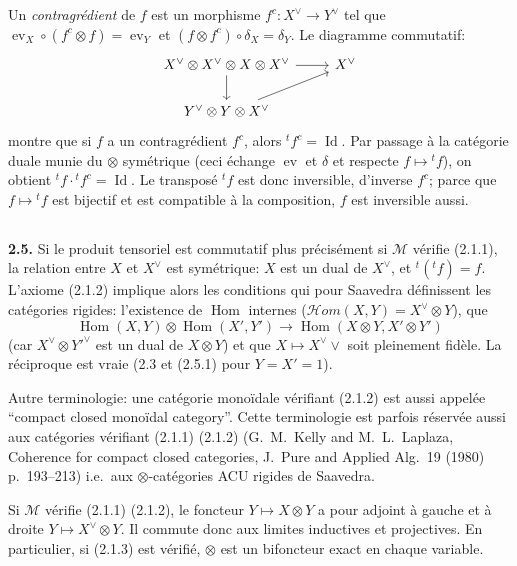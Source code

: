 \documentclass[12pt,a4paper]{article}
\theoremstyle{plain}
\theoremstyle{definition}
\theoremstyle{remark}
\DeclareMathOperator{\Hom}{Hom}
\DeclareMathOperator{\Id}{Id}
\DeclareMathOperator{\ev}{ev}
\begin{document}
Un \emph{contragrédient} de $f$ est un morphisme $f^c : X^\vee \to Y^\vee$ tel que $\ev_X \circ (f^c \otimes f) = \ev_Y$ et $(f \otimes f^c) \circ \delta_X = \delta_Y$. Le diagramme commutatif:
\[
\begin{tikzcd}
X^\vee \otimes X^\vee \otimes X \otimes X^\vee \arrow[r] \arrow[d] & X^\vee \\
Y^\vee \otimes Y \otimes X^\vee \arrow[ru]
\end{tikzcd}
\]
montre que si $f$ a un contragrédient $f^c$, alors ${}^t f^c = \Id$. Par passage à la catégorie duale munie du $\otimes$ symétrique (ceci échange $\ev$ et $\delta$ et respecte $f \mapsto {}^t f$), on obtient ${}^t f \cdot {}^t f^c = \Id$. Le transposé ${}^t f$ est donc inversible, d'inverse $f^c$; parce que $f \mapsto {}^t f$ est bijectif et est compatible à la composition, $f$ est inversible aussi.

\subsection{}

\textbf{2.5.} Si le produit tensoriel est commutatif plus précisément si $\mathcal{M}$ vérifie (2.1.1), la relation entre $X$ et $X^\vee$ est symétrique: $X$ est un dual de $X^\vee$, et ${}^t({}^t f) = f$. L'axiome (2.1.2) implique alors les conditions qui pour Saavedra définissent les catégories rigides: l'existence de $\Hom$ internes ($\mathcal{H}om(X,Y) = X^\vee \otimes Y$), que
\begin{equation}\label{eq:2.5.1}
\Hom(X,Y) \otimes \Hom(X',Y') \to \Hom(X \otimes Y, X' \otimes Y')
\end{equation}
(car $X^\vee \otimes Y'^\vee$ est un dual de $X \otimes Y$) et que $X \mapsto X^\vee \vee$ soit pleinement fidèle. La réciproque est vraie (2.3 et (2.5.1) pour $Y = X' = 1$).

Autre terminologie: une catégorie monoïdale vérifiant (2.1.2) est aussi appelée ``compact closed monoïdal category''. Cette terminologie est parfois réservée aussi aux catégories vérifiant (2.1.1) (2.1.2) (G.~M.~Kelly and M.~L.~Laplaza, Coherence for compact closed categories, J.~Pure and Applied Alg.~19 (1980) p.~193--213) i.e.~aux $\otimes$-catégories ACU rigides de Saavedra.

Si $\mathcal{M}$ vérifie (2.1.1) (2.1.2), le foncteur $Y \mapsto X \otimes Y$ a pour adjoint à gauche et à droite $Y \mapsto X^\vee \otimes Y$. Il commute donc aux limites inductives et projectives. En particulier, si (2.1.3) est vérifié, $\otimes$ est un bifoncteur exact en chaque variable.
\end{document}
